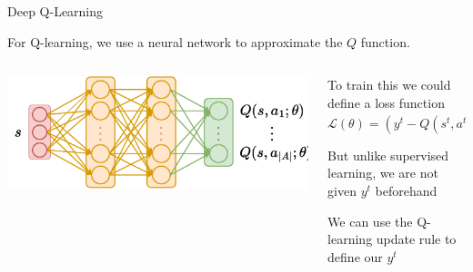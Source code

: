 \begin{frame}[t]{Deep Q-Learning}

For  Q-learning, we use a neural network to approximate the $Q$ function.
\vspace{5pt}
\begin{columns}
    \begin{column}{0.4\textwidth}
    \vspace{0pt}%
        \includegraphics[width=\textwidth]{images/chapter_8/dqn_architecture.pdf}
    \end{column}\hfill
    \begin{column}{0.6\textwidth}
    \vspace{0pt}%
        \blist
            \item<1-> To train this we could define a loss function $\mathcal{L}(\theta) = \left(y^t - Q(s^t,a^t;\theta) \right)^2$
            \item<1-> But unlike supervised learning, we are not given $y^t$ beforehand
            \item <2->We can use the Q-learning update rule to define our $y^t$
        \elist
    \end{column}    
\end{columns}   


\end{frame}

